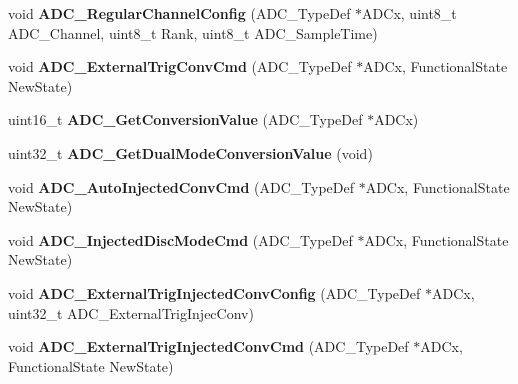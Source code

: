 \begin{DoxyCompactItemize}
\item 
\hypertarget{group__ADC__Exported__Functions_gac531adb577b648d4bb8881f2ed627d52}{
void {\bfseries ADC\_\-RegularChannelConfig} (ADC\_\-TypeDef $\ast$ADCx, uint8\_\-t ADC\_\-Channel, uint8\_\-t Rank, uint8\_\-t ADC\_\-SampleTime)}
\label{group__ADC__Exported__Functions_gac531adb577b648d4bb8881f2ed627d52}

\item 
\hypertarget{group__ADC__Exported__Functions_ga3ae92d7940a16c898223374a5857f509}{
void {\bfseries ADC\_\-ExternalTrigConvCmd} (ADC\_\-TypeDef $\ast$ADCx, FunctionalState NewState)}
\label{group__ADC__Exported__Functions_ga3ae92d7940a16c898223374a5857f509}

\item 
\hypertarget{group__ADC__Exported__Functions_gaaf74221c285ec5dab5e66baf7bec6bd3}{
uint16\_\-t {\bfseries ADC\_\-GetConversionValue} (ADC\_\-TypeDef $\ast$ADCx)}
\label{group__ADC__Exported__Functions_gaaf74221c285ec5dab5e66baf7bec6bd3}

\item 
\hypertarget{group__ADC__Exported__Functions_gac5a4792dc29ef7ff6bfbce9f37e8a668}{
uint32\_\-t {\bfseries ADC\_\-GetDualModeConversionValue} (void)}
\label{group__ADC__Exported__Functions_gac5a4792dc29ef7ff6bfbce9f37e8a668}

\item 
\hypertarget{group__ADC__Exported__Functions_ga1ff9c3b8e4bbdd2addfd227f1a506a66}{
void {\bfseries ADC\_\-AutoInjectedConvCmd} (ADC\_\-TypeDef $\ast$ADCx, FunctionalState NewState)}
\label{group__ADC__Exported__Functions_ga1ff9c3b8e4bbdd2addfd227f1a506a66}

\item 
\hypertarget{group__ADC__Exported__Functions_ga0b583b94183fa4ff287177b9ee808092}{
void {\bfseries ADC\_\-InjectedDiscModeCmd} (ADC\_\-TypeDef $\ast$ADCx, FunctionalState NewState)}
\label{group__ADC__Exported__Functions_ga0b583b94183fa4ff287177b9ee808092}

\item 
\hypertarget{group__ADC__Exported__Functions_gafc02ce1e84e96b692adf085f61a0bca6}{
void {\bfseries ADC\_\-ExternalTrigInjectedConvConfig} (ADC\_\-TypeDef $\ast$ADCx, uint32\_\-t ADC\_\-ExternalTrigInjecConv)}
\label{group__ADC__Exported__Functions_gafc02ce1e84e96b692adf085f61a0bca6}

\item 
\hypertarget{group__ADC__Exported__Functions_gad81d134c083d8f407c819e6f4722d553}{
void {\bfseries ADC\_\-ExternalTrigInjectedConvCmd} (ADC\_\-TypeDef $\ast$ADCx, FunctionalState NewState)}
\label{group__ADC__Exported__Functions_gad81d134c083d8f407c819e6f4722d553}


\end{DoxyCompactItemize}
